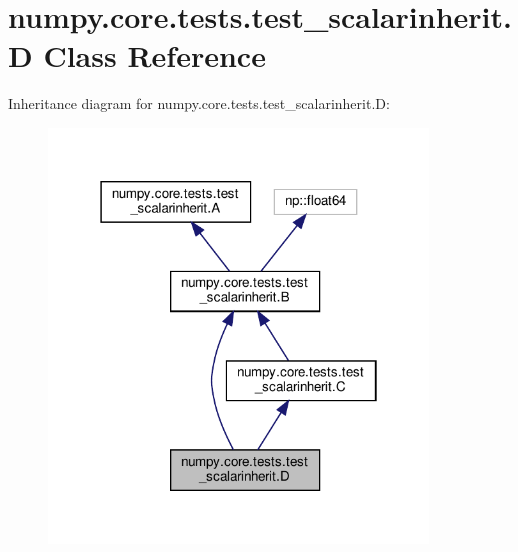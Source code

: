 \hypertarget{classnumpy_1_1core_1_1tests_1_1test__scalarinherit_1_1D}{}\section{numpy.\+core.\+tests.\+test\+\_\+scalarinherit.\+D Class Reference}
\label{classnumpy_1_1core_1_1tests_1_1test__scalarinherit_1_1D}


Inheritance diagram for numpy.\+core.\+tests.\+test\+\_\+scalarinherit.\+D\+:
\nopagebreak
\begin{figure}[H]
\begin{center}
\leavevmode
\includegraphics[width=286pt]{classnumpy_1_1core_1_1tests_1_1test__scalarinherit_1_1D__inherit__graph}
\end{center}
\end{figure}


